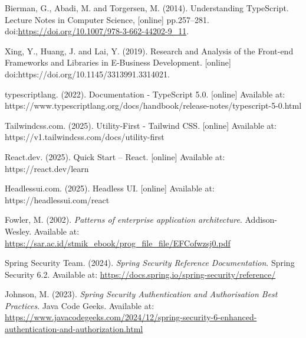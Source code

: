 \begin{thebibliography}{99}
    Bierman, G., Abadi, M. and Torgersen, M. (2014). Understanding TypeScript. Lecture Notes in Computer Science, [online] pp.257–281. doi:\url{https://doi.org/10.1007/978-3-662-44202-9\_11}.

    Xing, Y., Huang, J. and Lai, Y. (2019). Research and Analysis of the Front-end Frameworks and Libraries in E-Business Development.
    [online] doi:https://doi.org/10.1145/3313991.3314021.

    typescriptlang. (2022). Documentation - TypeScript 5.0. [online] Available at: https://www.typescriptlang.org/docs/handbook/release-notes/typescript-5-0.html

    Tailwindcss.com. (2025). Utility-First - Tailwind CSS. [online] Available at: https://v1.tailwindcss.com/docs/utility-first

    React.dev. (2025). Quick Start – React. [online] Available at: https://react.dev/learn

    Headlessui.com. (2025). Headless UI. [online] Available at: https://headlessui.com/react

    Fowler, M. (2002). \emph{Patterns of enterprise application architecture}. Addison-Wesley. 
    Available at: \url{https://sar.ac.id/stmik_ebook/prog_file_file/EFCofwzsj0.pdf}

    Spring Security Team. (2024). \emph{Spring Security Reference Documentation}. Spring Security 6.2.
    Available at: \url{https://docs.spring.io/spring-security/reference/}

    Johnson, M. (2023). \emph{Spring Security Authentication and Authorisation Best Practices}. Java Code Geeks.
    Available at: \url{https://www.javacodegeeks.com/2024/12/spring-security-6-enhanced-authentication-and-authorization.html}
    
\end{thebibliography}
